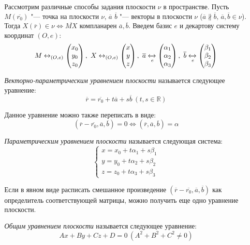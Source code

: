 Рассмотрим различные способы задания плоскости $\nu$ в пространстве. Пусть $M (\overline{r_0})$ "--- точка на плоскости $\nu$, $\overline{a}$ $\overline{b}$ "--- векторы в плоскости $\nu$ ($\overline{a} \nparallel \overline{b}$, $\overline{a}, \overline{b} \in \nu$). Тогда $X (\overline{r}) \in \nu \Leftrightarrow \overline{MX} \text{ компланарен } \overline{a}, \overline{b}$. Введем базис $e$ и декартову систему координат $(O, e)$:
\[M \leftrightarrow_{(O, e)}
\begin{pmatrix}
x_0\\y_0\\z_0
\end{pmatrix},~
X \leftrightarrow_{(O, e)}
\begin{pmatrix}
x\\y\\z
\end{pmatrix},~
\overline{a} \xleftrightarrow[e]{}
\begin{pmatrix}
\alpha_1\\\alpha_2\\\alpha_3
\end{pmatrix},~
\overline{b} \xleftrightarrow[e]{}
\begin{pmatrix}
\beta_1\\\beta_2\\\beta_3
\end{pmatrix}\]

\begin{definition} \textit{Векторно-параметрическим уравнением плоскости} называется следующее уравнение:
	\[\overline{r} = \overline{r_0} + t\overline{a} + s\overline{b}~(t,s \in \mathbb{R})\]
	
	Данное уравнение можно также переписать в виде:
	\[(\overline{r} - \overline{r_0}, \overline{a}, \overline{b}) = 0 \Leftrightarrow (\overline{r}, \overline{a}, \overline{b}) = \alpha\]
\end{definition}

\begin{definition} \textit{Параметрическим уравнением плоскости} называется следующая система:
	\[\left\{
	\begin{aligned}
	x = x_0 + t\alpha_1 + s\beta_1\\
	y = y_0 + t\alpha_2 + s\beta_2\\
	z = z_0 + t\alpha_3 + s\beta_3
	\end{aligned}
	\right.
	\]
\end{definition}

Если в явном виде расписать смешанное произведение $(\overline{r} - \overline{r_0}, \overline{a}, \overline{b})$ как определитель соответствующей матрицы, можно получить еще одно уравнение плоскости.
\begin{definition}
	\textit{Общим уравнением плоскости} называется следующее уравнение:
	\[Ax + By + Cz + D = 0~(A^2+B^2+C^2 \ne 0)\]
\end{definition}

